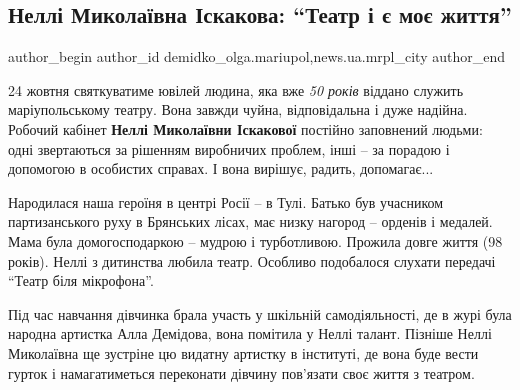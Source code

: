  
 
 
 
 
 
\subsection{Неллі Миколаївна Іскакова: \enquote{Театр і є моє життя}}
\label{sec:20_10_2019.stz.news.ua.mrpl_city.1.nelli_mykolaivna_iskakova_teatr_moje_zhyttja}
 
\ifcmt
 author_begin
   author_id demidko_olga.mariupol,news.ua.mrpl_city
 author_end
\fi


24 жовтня святкуватиме ювілей людина, яка вже \emph{50 років} віддано служить
маріупольському театру. Вона завжди чуйна, відповідальна і дуже надійна.
Робочий кабінет \textbf{Неллі Миколаївни Іскакової} постійно заповнений людьми: одні
звертаються за рішенням виробничих проблем, інші – за порадою і допомогою в
особистих справах. І вона вирішує, радить, допомагає...

Народилася наша героїня в центрі Росії – в Тулі. Батько був учасником
партизанського руху в Брянських лісах, має низку нагород – орденів і медалей.
Мама була домогосподаркою – мудрою і турботливою. Прожила довге життя (98
років). Неллі з дитинства любила театр. Особливо подобалося слухати передачі
\enquote{Театр біля мікрофона}.


Під час навчання дівчинка брала участь у шкільній самодіяльності, де в журі
була народна артистка Алла Демідова, вона помітила у Неллі талант. Пізніше
Неллі Миколаївна ще зустріне цю видатну артистку в інституті, де вона буде
вести гурток і намагатиметься переконати дівчину пов'язати своє життя з
театром.


